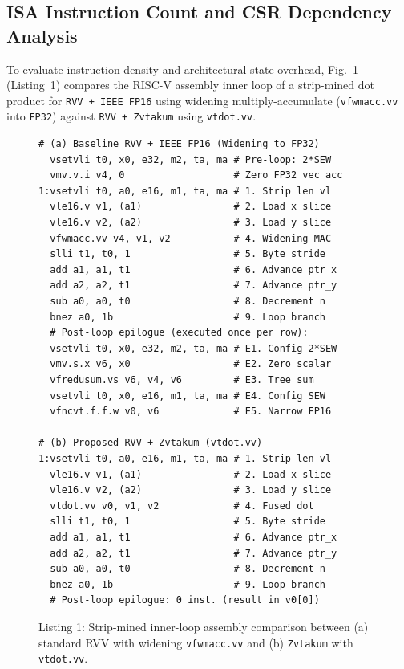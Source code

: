 \subsection{ISA Instruction Count and CSR Dependency Analysis}
\label{sec:isa_csr}

To evaluate instruction density and architectural state overhead, Fig.~\ref{fig:asm_loops} (Listing~1) compares the RISC-V assembly inner loop of a strip-mined dot product for \texttt{RVV + IEEE FP16} using widening multiply-accumulate (\texttt{vfwmacc.vv} into \texttt{FP32}) against \texttt{RVV + Zvtakum} using \texttt{vtdot.vv}.

\begin{figure}[htbp]
\scriptsize
\begin{verbatim}
# (a) Baseline RVV + IEEE FP16 (Widening to FP32)
  vsetvli t0, x0, e32, m2, ta, ma # Pre-loop: 2*SEW
  vmv.v.i v4, 0                   # Zero FP32 vec acc
1:vsetvli t0, a0, e16, m1, ta, ma # 1. Strip len vl
  vle16.v v1, (a1)                # 2. Load x slice
  vle16.v v2, (a2)                # 3. Load y slice
  vfwmacc.vv v4, v1, v2           # 4. Widening MAC
  slli t1, t0, 1                  # 5. Byte stride
  add a1, a1, t1                  # 6. Advance ptr_x
  add a2, a2, t1                  # 7. Advance ptr_y
  sub a0, a0, t0                  # 8. Decrement n
  bnez a0, 1b                     # 9. Loop branch
  # Post-loop epilogue (executed once per row):
  vsetvli t0, x0, e32, m2, ta, ma # E1. Config 2*SEW
  vmv.s.x v6, x0                  # E2. Zero scalar
  vfredusum.vs v6, v4, v6         # E3. Tree sum
  vsetvli t0, x0, e16, m1, ta, ma # E4. Config SEW
  vfncvt.f.f.w v0, v6             # E5. Narrow FP16

# (b) Proposed RVV + Zvtakum (vtdot.vv)
1:vsetvli t0, a0, e16, m1, ta, ma # 1. Strip len vl
  vle16.v v1, (a1)                # 2. Load x slice
  vle16.v v2, (a2)                # 3. Load y slice
  vtdot.vv v0, v1, v2             # 4. Fused dot
  slli t1, t0, 1                  # 5. Byte stride
  add a1, a1, t1                  # 6. Advance ptr_x
  add a2, a2, t1                  # 7. Advance ptr_y
  sub a0, a0, t0                  # 8. Decrement n
  bnez a0, 1b                     # 9. Loop branch
  # Post-loop epilogue: 0 inst. (result in v0[0])
\end{verbatim}
\caption{Listing 1: Strip-mined inner-loop assembly comparison between (a) standard RVV with widening \texttt{vfwmacc.vv} and (b) \texttt{Zvtakum} with \texttt{vtdot.vv}.}
\label{fig:asm_loops}
\end{figure}

